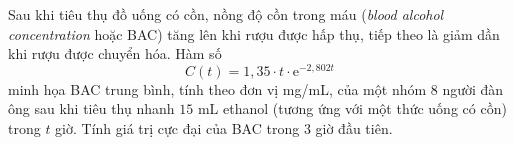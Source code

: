 \begin{bt}%
	Sau khi tiêu thụ đồ uống có cồn, nồng độ cồn trong máu (\textit{blood alcohol concentration} hoặc BAC) tăng lên khi rượu được hấp thụ, tiếp theo là giảm dần khi rượu được chuyển hóa. Hàm số $$C(t)=1{,}35\cdot t\cdot \mathrm{e}^{-2{,}802t}$$ minh họa BAC trung bình, tính theo đơn vị mg/mL, của một nhóm $8$ người đàn ông sau khi tiêu thụ nhanh $15$ mL ethanol (tương ứng với một thức uống có cồn) trong $t$ giờ. Tính giá trị cực đại của BAC trong $3$ giờ đầu tiên.
\end{bt}

